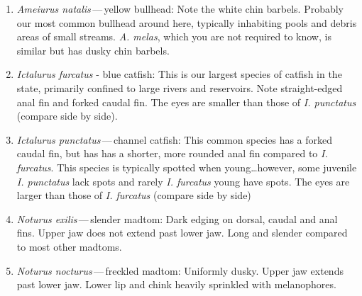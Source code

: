 \documentclass[11pt]{article}
\begin{document}
\begin{enumerate}

\item \textit{Ameiurus natalis}\,—\,yellow bullhead:  Note the white chin barbels.  Probably our most common bullhead around here, typically inhabiting pools and debris areas of small streams. \textit{A. melas}, which you are not required to know, is similar but has dusky chin barbels.
\item \textit{Ictalurus furcatus} - blue catfish:  This is our largest species of catfish in the state, primarily confined to large rivers and reservoirs.  Note straight-edged anal fin and forked caudal fin. The eyes are smaller than those of \textit{I. punctatus} (compare side by side).
\item \textit{Ictalurus punctatus}\,—\,channel catfish:  This common species has a forked caudal fin, but has has a shorter, more rounded anal fin compared to \textit{I. furcatus}.  This species is typically spotted when young…however, some juvenile \textit{I. punctatus} lack spots and rarely \textit{I. furcatus} young have spots. The eyes are larger than those of \textit{I. furcatus} (compare side by side)
\item \textit{Noturus exilis}\,—\,slender madtom:  Dark edging on dorsal, caudal and anal fins. Upper jaw does not extend past lower jaw. Long and slender compared to most other madtoms.
\item \textit{Noturus nocturus}\,—\,freckled madtom: Uniformly dusky. Upper jaw extends past lower jaw. Lower lip and chink heavily sprinkled with melanophores.

\end{enumerate}
\end{document}
